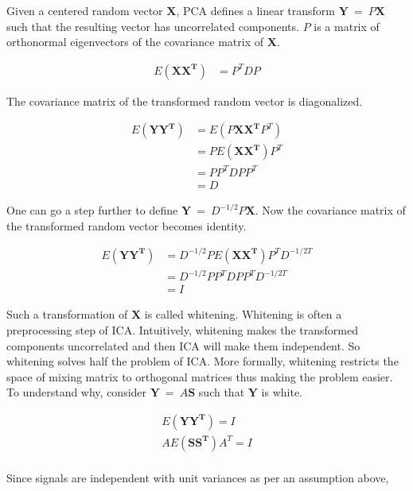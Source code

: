 \documentclass[11pt, a4paper]{article}
\begin{document}
Given a centered random vector $\boldsymbol{X}$, PCA defines a linear transform $\boldsymbol{Y}\ =\ P \boldsymbol{X}$ such that the resulting vector has uncorrelated components. $P$ is a matrix of orthonormal eigenvectors of the covariance matrix of $\boldsymbol{X}$.

\begin{align*}
	E(\boldsymbol{XX^T}) & = P^TDP 
\end{align*}

The covariance matrix of the transformed random vector is diagonalized.

\begin{align*}
	E(\boldsymbol{YY^T}) & = E(P\boldsymbol{XX^T}P^T) \\
	                     & = PE(\boldsymbol{XX^T})P^T \\
	                     & = PP^TDPP^T                \\
	                     & = D                        
\end{align*}

One can go a step further to define $\boldsymbol{Y}\ =\ D^{-1/2}P\boldsymbol{X}$. Now the covariance matrix of the transformed random vector becomes identity.

\begin{align*}
	E(\boldsymbol{YY^T}) & = D^{-1/2}PE(\boldsymbol{XX^T})P^TD^{-1/2T} \\
	                     & = D^{-1/2}PP^TDPP^TD^{-1/2T}                \\
	                     & = I                                         
\end{align*}

Such a transformation of $\boldsymbol{X}$ is called whitening. Whitening is often a preprocessing step of ICA. Intuitively, whitening makes the transformed components uncorrelated and then ICA will make them independent. So whitening solves half the problem of ICA. More formally, whitening restricts the space of mixing matrix to orthogonal matrices thus making the problem easier. To understand why, consider $\boldsymbol{Y}\ =\  A\boldsymbol{S}$ such that $\boldsymbol{Y}$ is white.

\begin{align*}
	E(\boldsymbol{YY^T}) = I      \\
	AE(\boldsymbol{SS^T}) A^T = I \\
\end{align*}

Since signals are independent with unit variances as per an assumption above,
\end{document}
